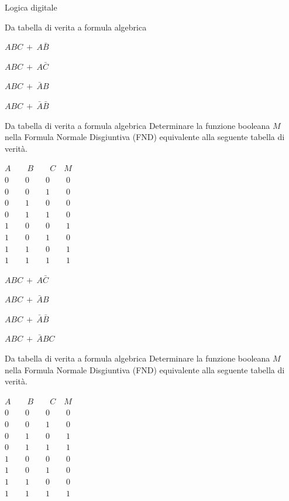 \documentclass[11pt]{article}
\begin{document}
\begin{quiz}{Logica digitale}
\begin{multi}[points=1,shuffle=true]{Da tabella di verita a formula algebrica}
    \item* $ABC\ +\ A\bar{B}$
    \item $ABC\ +\ A\bar{C}$
    \item $ABC\ +\ \bar{A}B$
    \item $ABC\ +\ \bar{A}\bar{B}$
\end{multi}

\begin{multi}[points=1,shuffle=true]{Da tabella di verita a formula algebrica}
    Determinare la funzione booleana $M$ nella Formula Normale Disgiuntiva (FND) equivalente alla seguente tabella di verit\`{a}.

    $A \qquad  B \qquad  C \quad M$ \\
    $0 \qquad 0 \qquad 0 \qquad 0$ \\
    $0 \qquad 0 \qquad 1 \qquad 0$ \\
    $0 \qquad 1 \qquad 0 \qquad 0$ \\
    $0 \qquad 1 \qquad 1 \qquad 0$ \\
    $1 \qquad 0 \qquad 0 \qquad 1$ \\
    $1 \qquad 0 \qquad 1 \qquad 0$ \\
    $1 \qquad 1 \qquad 0 \qquad 1$ \\
    $1 \qquad 1 \qquad 1 \qquad 1$ \\
    
    \item* $ABC\ +\ A\bar{C}$
    \item $ABC\ +\ \bar{A}B$
    \item $ABC\ +\ \bar{A}\bar{B}$
    \item $ABC\ +\ \bar{A}BC$
\end{multi}

\begin{multi}[points=1,shuffle=true]{Da tabella di verita a formula algebrica}
    Determinare la funzione booleana $M$ nella Formula Normale Disgiuntiva (FND) equivalente alla seguente tabella di verit\`{a}.

    $A \qquad  B \qquad  C \quad M$ \\
    $0 \qquad 0 \qquad 0 \qquad 0$ \\
    $0 \qquad 0 \qquad 1 \qquad 0$ \\
    $0 \qquad 1 \qquad 0 \qquad 1$ \\
    $0 \qquad 1 \qquad 1 \qquad 1$ \\
    $1 \qquad 0 \qquad 0 \qquad 0$ \\
    $1 \qquad 0 \qquad 1 \qquad 0$ \\
    $1 \qquad 1 \qquad 0 \qquad 0$ \\
    $1 \qquad 1 \qquad 1 \qquad 1$ \\
    

\end{multi}
\end{quiz}
\end{document}

